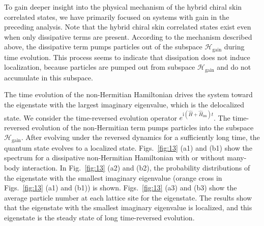 \documentclass[longbibliography, aps, prx, amsmath, amssymb, amsfonts, twocolumn,superscriptaddress, footinbib]{revtex4-1}
\begin{document}
	
	
	To gain deeper insight into the physical mechanism of the hybrid chiral skin correlated states, we have primarily focused on systems with gain in the preceding analysis.  
	Note that the hybrid chiral skin correlated states exist even when only dissipative terms are present.
	According to the mechanism described above, the dissipative term pumps particles out of the subspace $\mathscr{H}_{\text{gain}}$ during time evolution.
	This process seems to indicate that dissipation does not induce localization, because particles are pumped out from subspace $\mathscr{H}_{\text{gain}}$ and do not accumulate in this subspace.

	The time evolution of the  non-Hermitian Hamiltonian drives the system toward the eigenstate with the largest imaginary eigenvalue, which is the delocalized state.
	We consider the time-reversed evolution operator $e^{\mathrm{i}(\hat{H} + \hat{H}_{\text{im}})t}$. The time-reversed evolution of the non-Hermitian term pumps particles into the subspace $\mathscr{H}_{\text{gain}}$. After evolving under the reversed dynamics for a sufficiently long time, the quantum state evolves to a localized state.
	Figs.~\ref{fig:13} (a1) and (b1) show the spectrum for a dissipative non-Hermitian Hamiltonian with or without many-body interaction. 
	In Fig.~\ref{fig:13} (a2) and (b2), the probability distributions of the eigenstate with the smallest imaginary eigenvalue (orange cross in Figs.~\ref{fig:13} (a1) and (b1)) is shown.
	Figs.~\ref{fig:13} (a3) and (b3) show the average particle number at each lattice site for the eigenstate. 
	The results show that the eigenstate with the smallest imaginary eigenvalue is localized, and this eigenstate is the steady state of long time-reversed evolution. 
\end{document}
